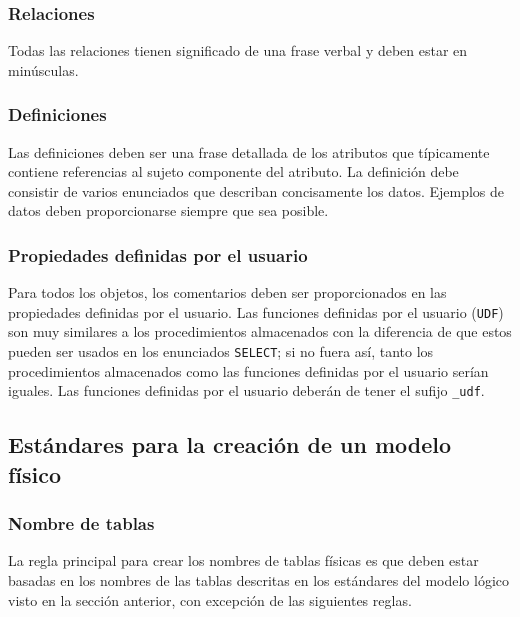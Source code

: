 \subsubsection{Relaciones}

Todas las relaciones tienen significado de una frase verbal y deben estar en
minúsculas.

\subsubsection{Definiciones}

Las definiciones deben ser una frase detallada de los atributos que típicamente
contiene referencias al sujeto componente del atributo. La definición debe
consistir de varios enunciados que describan concisamente los datos. Ejemplos de
datos deben proporcionarse siempre que sea posible.

\subsubsection{Propiedades definidas por el usuario}

Para todos los objetos, los comentarios deben ser proporcionados en las
propiedades definidas por el usuario. Las funciones definidas por el usuario
(\texttt{UDF}) son muy similares a los procedimientos almacenados con la
diferencia de que estos pueden ser usados en los enunciados \texttt{SELECT}; si
no fuera así, tanto los procedimientos almacenados como las funciones definidas
por el usuario serían iguales. Las funciones definidas por el usuario deberán de
tener el sufijo \texttt{\_udf}.

\subsection{Estándares para la creación de un modelo físico}

\subsubsection{Nombre de tablas}

La regla principal para crear los nombres de tablas físicas es que deben estar
basadas en los nombres de las tablas descritas en los estándares del modelo
lógico visto en la sección anterior, con excepción de las siguientes reglas.

